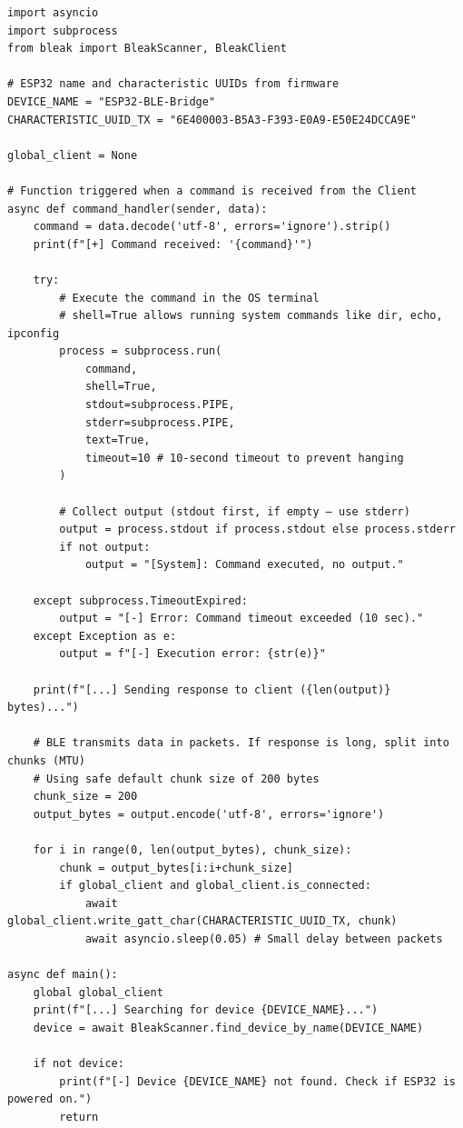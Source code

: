 \begin{lstlisting}[caption={Серверная часть на ПК 2}, label={lst:lab4_server}]
import asyncio
import subprocess
from bleak import BleakScanner, BleakClient

# ESP32 name and characteristic UUIDs from firmware
DEVICE_NAME = "ESP32-BLE-Bridge"
CHARACTERISTIC_UUID_TX = "6E400003-B5A3-F393-E0A9-E50E24DCCA9E"

global_client = None

# Function triggered when a command is received from the Client
async def command_handler(sender, data):
    command = data.decode('utf-8', errors='ignore').strip()
    print(f"[+] Command received: '{command}'")

    try:
        # Execute the command in the OS terminal
        # shell=True allows running system commands like dir, echo, ipconfig
        process = subprocess.run(
            command,
            shell=True,
            stdout=subprocess.PIPE,
            stderr=subprocess.PIPE,
            text=True,
            timeout=10 # 10-second timeout to prevent hanging
        )

        # Collect output (stdout first, if empty — use stderr)
        output = process.stdout if process.stdout else process.stderr
        if not output:
            output = "[System]: Command executed, no output."

    except subprocess.TimeoutExpired:
        output = "[-] Error: Command timeout exceeded (10 sec)."
    except Exception as e:
        output = f"[-] Execution error: {str(e)}"

    print(f"[...] Sending response to client ({len(output)} bytes)...")

    # BLE transmits data in packets. If response is long, split into chunks (MTU)
    # Using safe default chunk size of 200 bytes
    chunk_size = 200
    output_bytes = output.encode('utf-8', errors='ignore')

    for i in range(0, len(output_bytes), chunk_size):
        chunk = output_bytes[i:i+chunk_size]
        if global_client and global_client.is_connected:
            await global_client.write_gatt_char(CHARACTERISTIC_UUID_TX, chunk)
            await asyncio.sleep(0.05) # Small delay between packets

async def main():
    global global_client
    print(f"[...] Searching for device {DEVICE_NAME}...")
    device = await BleakScanner.find_device_by_name(DEVICE_NAME)

    if not device:
        print(f"[-] Device {DEVICE_NAME} not found. Check if ESP32 is powered on.")
        return


\end{lstlisting}
